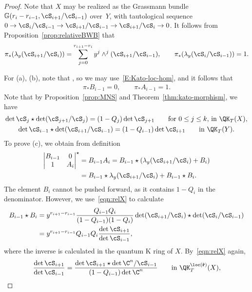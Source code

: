  \begin{proof}
 Note that $X$ may be realized as the Grassmann bundle $\mathbb{G}(r_i-r_{i-1}, \cS_{i+1}/\cS_{i-1})$
 over~$Y$, with tautological sequence $0 \to \cS_i/\cS_{i-1} \to \cS_{i+1}/\cS_{i-1} \to \cS_{i+1}/\cS_{i} \to 0$.
 It follows from Proposition~\ref{prop:relativeBWB} that
 \begin{equation}\label{eqn:pushforwards-lambda}
 \pi_*(\lambda_y(\cS_{i+1}/\cS_{i}))=\sum_{j=0}^{r_{i+1}-r_i}y^j\wedge^j(\cS_{i+1}/\cS_{i-1}), \qquad\pi_* (\lambda_y(\cS_i/\cS_{i-1})) = 1.
 \end{equation}

 For (a), (b), note that , so we may use~\eqref{E:Kato-loc-hom}, and it follows that
 \begin{gather*}%
 \pi_*B_{i-1}=0,\qquad \pi_*A_{i-1} = 1.
 \end{gather*}
 Note that by Proposition~\ref{prop:MNS} and Theorem~\ref{thm:kato-morphism}, we have
 \begin{gather}
 \det\cS_{j}\star\det(\cS_{j+1}/\cS_{j})=(1-Q_{j})\det\cS_{j+1}\qquad \text{for $0\leq j\leq k$, in $\QK_T(X)$},\label{eqn:relX}\\
 \det\cS_{i-1}\star\det(\cS_{i+1}/\cS_{i-1})=(1-Q_{i-1})\det\cS_{i+1}\qquad \text{in $\QK_T(Y)$}.\label{eqn:relY}
\end{gather}
 To prove (c), we obtain from definition
 \begin{align}
 \begin{vmatrix}
 B_{i-1} & 0\\
 1 & A_{i}
 \end{vmatrix}^\star
 &{}= B_{i-1}A_i=B_{i-1} \star (\lambda_y(\cS_{i+1}/\cS_i)+B_i)\nonumber\\
 &{}= B_{i-1}\star \lambda_y(\cS_{i+1}/\cS_i)+ B_{i-1} \star B_i .\qquad\label{eqn:3-expand}
 \end{align}
 The element $B_{i}$ cannot be pushed forward, as it contains $1-Q_i$ in the denominator. However,
 we use~\eqref{eqn:relX} to calculate
 \begin{align*}
 B_{i-1} \star B_i &{}= y^{r_{i+1}-r_{i-1}} \frac{Q_{i-1} Q_i}{(1-Q_{i-1})(1-Q_i)} \det (\cS_{i+1}/\cS_i) \star \det (\cS_{i}/\cS_{i-1}) \\
 &{}= y^{r_{i+1}-r_{i-1}}Q_{i-1}Q_i\frac{\det\cS_{i+1}}{\det\cS_{i-1}} ,
 \end{align*}
 where the inverse is calculated in the quantum K ring of $X$. By~\eqref{eqn:relX} again,
 \[ \frac{\det\cS_{i+1}}{\det\cS_{i-1}} = \frac{\det \cS_{i+1} \star\det \C^n/\cS_{i-1}}{(1-Q_{i-1})\det \C^n}\qquad \text{in $\QK_T^{\loc(\mathbf{\hat r})}(X)$}, \]

\end{proof}
